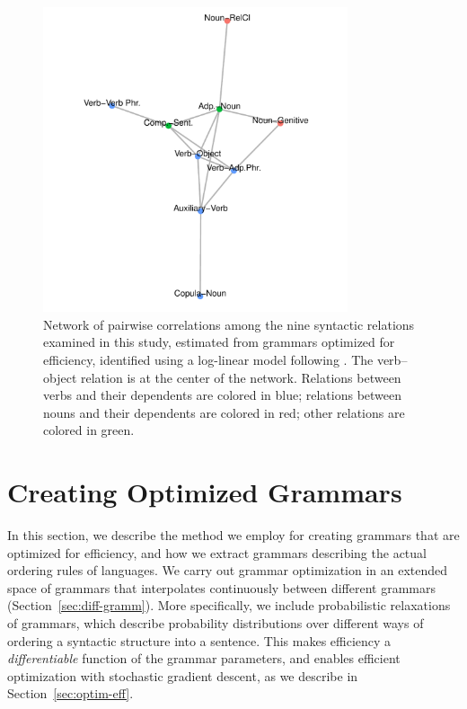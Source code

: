 \documentclass[10pt,twoside,lineno]{article}
\begin{document}
\begin{figure}
	\begin{center}
	\includegraphics[width=0.8\textwidth]{../results/correlations/analysis/controls/loglinear-pairwise-correlations.pdf}
	\end{center}
	\caption{Network of pairwise correlations among the nine syntactic relations examined in this study, estimated from grammars optimized for efficiency, identified using a log-linear model following \citet{justeson1990explanation}. The verb--object relation is at the center of the network. Relations between verbs and their dependents are colored in blue; relations between nouns and their dependents are colored in red; other relations are colored in green.}\label{fig:loglinear}
\end{figure}




\section{Creating Optimized Grammars}

In this section, we describe the method we employ for creating grammars that are optimized for efficiency, and how we extract grammars describing the actual ordering rules of languages.
We carry out grammar optimization in an extended space of grammars that interpolates continuously between different grammars (Section~\ref{sec:diff-gramm}).
More specifically, we include probabilistic relaxations of grammars, which describe probability distributions over different ways of ordering a syntactic structure into a sentence.
This makes efficiency a \emph{differentiable} function of the grammar parameters, and enables efficient optimization with stochastic gradient descent, as we describe in Section~\ref{sec:optim-eff}.
\end{document}
